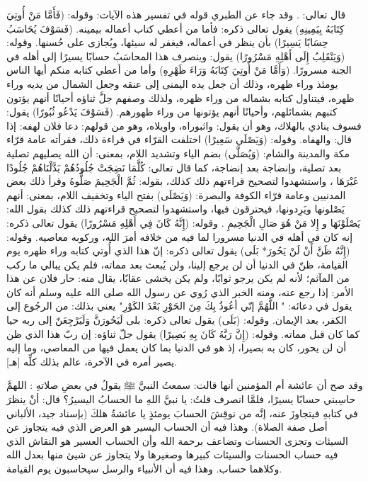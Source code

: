 قال تعالى:   
\quranayah*[84][7-15]{\footnotesize \surahname*[84]}. وقد جاء عن الطبري قوله في تفسير هذه الآيات: وقوله: (فَأَمَّا مَنْ أُوتِيَ كِتَابَهُ بِيَمِينِهِ) يقول تعالى ذكره: فأما من أعطي كتاب أعماله بيمينه. (فَسَوْفَ يُحَاسَبُ حِسَابًا يَسِيرًا) بأن ينظر في أعماله، فيغفر له سيئها، ويُجازى على حُسنها. وقوله: (وَيَنْقَلِبُ إِلَى أَهْلِهِ مَسْرُورًا) يقول: وينصرف هذا المحاسَبُ حسابًا يسيرًا إلى أهله في الجنة مسرورًا. (وَأَمَّا مَنْ أُوتِيَ كِتَابَهُ وَرَاءَ ظَهْرِهِ) وأما من أعطي كتابه منكم أيها الناس يومئذ وراء ظهره، وذلك أن جعل يده اليمنى إلى عنقه وجعل الشمال من يديه وراء ظهره، فيتناول كتابه بشماله من وراء ظهره، ولذلك وصفهم جلَّ ثناؤه أحيانًا أنهم يؤتون كتبهم بشمائلهم، وأحيانًا أنهم يؤتونها من وراء ظهورهم. (فَسَوْفَ يَدْعُو ثُبُورًا) يقول: فسوف ينادي بالهلاك، وهو أن يقول: واثبوراه، واويلاه، وهو من قولهم: دعا فلان لهفه: إذا قال: والهفاه. وقوله: (وَيَصْلَى سَعِيرًا) اختلفت القرّاء في قراءة ذلك، فقرأته عامة قرّاء مكة والمدينة والشام: (وَيُصَلَّى) بضم الياء وتشديد اللام، بمعنى: أن الله يصليهم تصلية بعد تصلية، وإنضاجة بعد إنضاجة، كما قال تعالى: كُلَّمَا نَضِجَتْ جُلُودُهُمْ بَدَّلْنَاهُمْ جُلُودًا غَيْرَهَا ، واستشهدوا لتصحيح قراءتهم ذلك كذلك، بقوله: ثُمَّ الْجَحِيمَ صَلُّوهُ وقرأ ذلك بعض المدنيين وعامة قرّاء الكوفة والبصرة: (وَيَصْلَى) بفتح الياء وتخفيف اللام، بمعنى: أنهم يَصْلونها ويَرِدونها، فيحترقون فيها، واستشهدوا لتصحيح قراءتهم ذلك كذلك بقول الله: يَصْلَوْنَهَا و إِلا مَنْ هُوَ صَالِ الْجَحِيمِ . وقوله: (إِنَّهُ كَانَ فِي أَهْلِهِ مَسْرُورًا) يقول تعالى ذكره: إنه كان في أهله في الدنيا مسرورا لما فيه من خلافه أمرَ الله، وركوبه معاصيه. وقوله: (إِنَّهُ ظَنَّ أَنْ لَنْ يَحُورَ* بَلَى) يقول تعالى ذكره: إنّ هذا الذي أُوتي كتابه وراء ظهره يوم القيامة، ظنّ في الدنيا أن لن يرجع إلينا، ولن يُبعث بعد مماته، فلم يكن يبالي ما ركب من المآثم؛ لأنه لم يكن يرجو ثوابًا، ولم يكن يخشى عقابًا، يقال منه: حار فلان عن هذا الأمر: إذا رجع عنه، ومنه الخبر الذي رُوي عن رسول الله صلى الله عليه وسلم أنه كان يقول في دعائه: " اللَّهُمَّ إنّي أعُوذُ بِكَ مِنَ الحَوْرِ بَعْدَ الكَوْرِ" يعني بذلك: من الرجُوع إلى الكفر، بعد الإيمان. وقوله: (بَلَى) يقول تعالى ذكره: بلى لَيَحُورَنَّ وَلَيَرْجِعَنّ إلى ربه حيا كما كان قبل مماته. وقوله: (إِنَّ رَبَّهُ كَانَ بِهِ بَصِيرًا) يقول جلّ ثناؤه: إن ربّ هذا الذي ظن أن لن يحور، كان به بصيرا، إذ هو في الدنيا بما كان يعمل فيها من المعاصي، وما إليه يصير أمره في الآخرة، عالم بذلك كلِّه [هـ].

وقد صح أن عائشة أم المؤمنين أنها قالت: سمعتُ النبيَّ ﷺ يقولُ في بعضِ صلاتهِ : اللهمَّ حاسِبني حسابًا يسيرًا، فلمَّا انصرف قلتُ: يا نبيَّ اللهِ ما الحسابُ اليسيرُ؟ قال: أنْ ينظرَ في كتابهِ فيتجاوزَ عنه، إنَّه من نوقِشَ الحسابَ يومئذٍ يا عائشةُ هلكَ {\footnotesize (بإسناد جيد، الألباني أصل صفة الصلاة)}. وهذا فيه أن الحساب اليسير هو العرض الذي فيه يتجاوز عن السيئات وتجزى الحسنات وتضاعف برحمة الله وأن الحساب العسير هو النقاش الذي فيه حساب الحسنات والسيئات كبيرها وصغيرها ولا يتجاوز عن شيئ منها بعدل الله وكلاهما حساب. وهذا فيه أن الأنبياء والرسل سيحاسبون يوم القيامة. 

